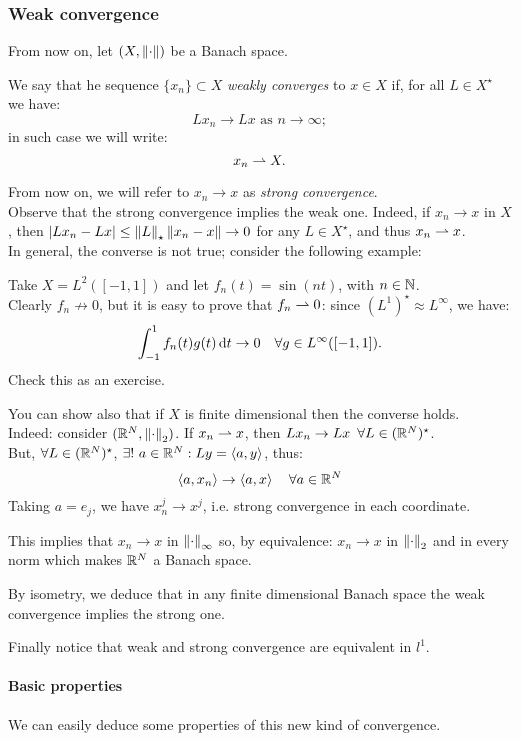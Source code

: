 \subsubsection{Weak convergence}
From now on, let $(X, \left\lVert\cdot\right\rVert)$ be a Banach space.
\begin{defn}
	We say that he sequence $\{x_n\} \subset X$ \emph{weakly converges} to $x \in X$ if, for all $ L \in X^\star$ we have:
	$$L x_n \to L x \text{ as }  n \to \infty;$$
	in such case we will write:
	$$x_n \rightharpoonup X.$$
\end{defn}

From now on, we will refer to $x_n \to x$ as \emph{strong convergence}.\\
Observe that the strong convergence implies the weak one. Indeed, if $x_n \to x$ in $X$, then $|Lx_n-Lx| \leq \left\lVert L\right\rVert_\star \left\lVert x_n-x\right\rVert \to 0$ for any $L \in X^\star$, and thus $x_n \rightharpoonup x$.\\
In general, the converse is not true; consider the following example:
\begin{exam}
	Take $X=L^2([-1,1])$ and let $f_n(t) = \sin(nt)$, with $n \in \mathbb N$.\\
	Clearly $f_n \not \to 0$, but it is easy to prove that $f_n \rightharpoonup 0$: since $(L^1)^\star \approx L^\infty$, 
	we have:
	$$\int_{-1}^1 f_n(t) g(t) \, \mathrm d t \to 0 \quad \forall g \in L^\infty ([-1,1]).$$
	Check this as an exercise.
\end{exam}

You can show also that if $X$ is finite dimensional then the converse holds.\\
Indeed: consider $(\mathbb R^N, \left\lVert\cdot\right\rVert_2)$. If $x_n \rightharpoonup x$, then $L x_n \to L x \enspace \forall L \in (\mathbb R^N)^\star$. \\
But, $\forall L \in (\mathbb R^N)^\star$, $\exists! \ a \in \mathbb R^N: L y=\left\langle a, y\right\rangle$, thus:
$$\left\langle a, x_n\right\rangle \to \left\langle a, x\right\rangle \quad \forall a \in \mathbb R^N$$
Taking $ a = e_j$, we have $x_n^j \to x^j$, i.e. strong convergence in each coordinate.

This implies that $x_n \to x$ in $\left\lVert\cdot\right\rVert_\infty$ so, by equivalence: $ x_n \to x$ in $\left\lVert\cdot\right\rVert_2$ and in every norm which makes $\mathbb R^N$ a Banach space.

By isometry, we deduce that in any finite dimensional Banach space the weak convergence implies the strong one.

Finally notice that weak and strong convergence are equivalent in $l^1$.%

\paragraph{Basic properties} We can easily deduce some properties of this new kind of convergence.

